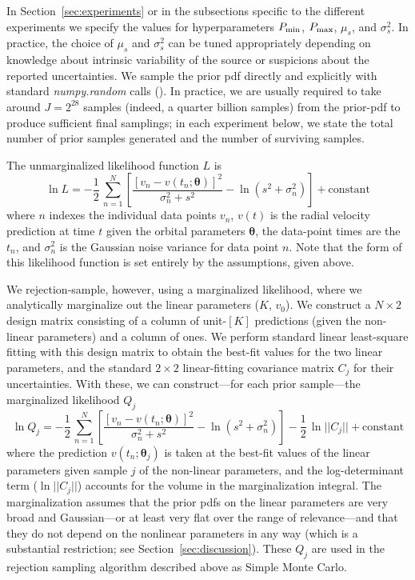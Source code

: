 \documentclass[manuscript, letterpaper]{aastex6}
\newcommand{\project}[1]{\textsl{#1}}
\newcommand{\sectionname}{Section}
\newcommand{\bs}[1]{\boldsymbol{#1}}
\begin{document}
In \sectionname~\ref{sec:experiments} or in the subsections specific to the
different experiments we specify the values for hyperparameters $P_{\rm min}$,
$P_{\rm max}$, $\mu_s$, and $\sigma^2_s$.
In practice, the choice of $\mu_s$ and $\sigma^2_s$ can be tuned appropriately
depending on knowledge about intrinsic variability of the source or suspicions
about the reported uncertainties.
We sample the prior pdf directly and explicitly with standard
\project{numpy.random} calls (\citealt{Van-der-Walt:2011}).
In practice, we are usually required to take around $J=2^{28}$ samples (indeed,
a quarter billion samples) from the prior-pdf to produce sufficient final
samplings; in each experiment below, we state  the total number of prior samples
generated and the number of surviving samples.

The unmarginalized likelihood function $L$ is
\begin{equation}
\ln L = -\frac{1}{2}\,\sum_{n=1}^N \left[\frac{[v_n - v(t_n;\bs{\theta})]^2}{\sigma_n^2 + s^2}
 -\ln \left(s^2 + \sigma_n^2\right) \right] + \mathrm{constant}
\end{equation}
where $n$ indexes the individual data points $v_n$, $v(t)$ is the radial
velocity prediction at time $t$ given the orbital parameters $\bs{\theta}$, the
data-point times are the $t_n$, and $\sigma_n^2$ is the Gaussian noise variance
for data point $n$.
Note that the form of this likelihood function is set entirely by the
assumptions, given above.

We rejection-sample, however, using a marginalized likelihood, where we
analytically marginalize out the linear parameters ($K$, $v_0$).
We construct a $N \times 2$ design matrix consisting of a column of unit-$[K]$
predictions (given the non-linear parameters) and a column of ones.
We perform standard linear least-square fitting with this design
matrix to obtain the best-fit values for the two linear parameters,
and the standard $2\times 2$ linear-fitting covariance matrix $C_j$ for their
uncertainties.
With these, we can construct---for each prior sample---the marginalized
likelihood $Q_j$
\begin{equation}
\ln Q_j = -\frac{1}{2}\,\sum_{n=1}^N \left[\frac{[v_n - v(t_n;\bs{\theta})]^2}{\sigma_n^2 + s^2}
 -\ln \left(s^2 + \sigma_n^2\right) \right] -\frac{1}{2}\,\ln ||C_j||
 + \mathrm{constant}
\end{equation}
where the prediction $v(t_n;\bs{\theta}_j)$ is taken at the best-fit values of
the linear parameters given sample $j$ of the non-linear parameters, and the
log-determinant term ($\ln ||C_j||$) accounts for the volume in the
marginalization integral.
The marginalization assumes that the prior pdfs on the linear parameters
are very broad and Gaussian---or
at least very flat over the range of relevance---and that they do not depend
on the nonlinear parameters in any way (which is a substantial restriction;
see \sectionname~\ref{sec:discussion}).
These $Q_j$ are used in the rejection sampling algorithm described above
as Simple Monte Carlo.
\end{document}
